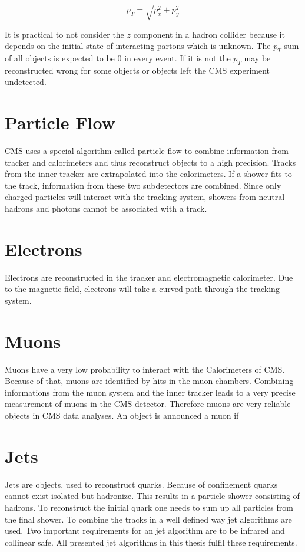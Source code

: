 	\begin{equation}
	p_T = \sqrt{p_x^2 + p_y^2}
	\end{equation} 

	\noindent It is practical to not consider the $z$ component in a hadron collider because it depends on the initial state of interacting partons which is unknown. The $p_T$ sum of all objects is expected to be $0$ in every event. If it is not the $p_T$ may be reconstructed wrong for some objects or objects left the CMS experiment undetected.
\section{Particle Flow}
	CMS uses a special algorithm called particle flow \cite{particleflow} to combine information from tracker and calorimeters and thus reconstruct objects to a high precision. Tracks from the inner tracker are extrapolated into the calorimeters. If a shower fits to the track, information from these two subdetectors are combined. Since only charged particles will interact with the tracking system, showers from neutral hadrons and photons cannot be associated with a track.
\section{Electrons}
	Electrons are reconstructed in the tracker and electromagnetic calorimeter. Due to the magnetic field, electrons will take a curved path through the tracking system.
\section{Muons}
	Muons have a very low probability to interact with the Calorimeters of CMS. Because of that, muons are identified by hits in the muon chambers. Combining informations from the muon system and the inner tracker leads to a very precise measurement of muons in the CMS detector. Therefore muons are very reliable objects in CMS data analyses. An object is announced a muon if %
\section{Jets}
	Jets are objects, used to reconstruct quarks. Because of confinement quarks cannot exist isolated but hadronize. This results in a particle shower consisting of hadrons. To reconstruct the initial quark one needs to sum up all particles from the final shower. To combine the tracks in a well defined way jet algorithms are used. Two important requirements for an jet algorithm are to be infrared and collinear safe. 
	All presented jet algorithms in this thesis fulfil these requirements.
